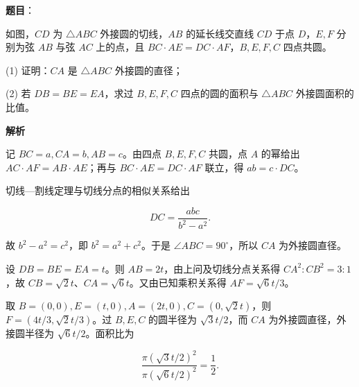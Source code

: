 \begin{answer}

\textbf{题目}：

如图，$CD$ 为 $\triangle ABC$ 外接圆的切线，$AB$ 的延长线交直线 $CD$ 于点 $D$，$E,F$ 分别为弦 $AB$ 与弦 $AC$ 上的点，且 $BC\cdot AE=DC\cdot AF$，$B,E,F,C$ 四点共圆。
\nopagebreak[4]
\begin{center}\end{center}
\nopagebreak[4]
(1) 证明：$CA$ 是 $\triangle ABC$ 外接圆的直径；

(2) 若 $DB=BE=EA$，求过 $B,E,F,C$ 四点的圆的面积与 $\triangle ABC$ 外接圆面积的比值。

\textbf{解析}


记 $BC=a,CA=b,AB=c$。由四点 $B,E,F,C$ 共圆，点 $A$ 的幂给出 $AC\cdot AF=AB\cdot AE$；再与 $BC\cdot AE=DC\cdot AF$ 联立，得 $ab=c\cdot DC$。

切线—割线定理与切线分点的相似关系给出

\nopagebreak[4]
\[DC=\frac{abc}{b^2-a^2}.\]

故 $b^2-a^2=c^2$，即 $b^2=a^2+c^2$。于是 $\angle ABC=90^\circ$，所以 $CA$ 为外接圆直径。


设 $DB=BE=EA=t$。则 $AB=2t$，由上问及切线分点关系得 $CA^2:CB^2=3:1$，故 $CB=\sqrt2t$、$CA=\sqrt6t$。又由已知乘积关系得 $AF=\sqrt6t/3$。

取 $B=(0,0),E=(t,0),A=(2t,0),C=(0,\sqrt2t)$，则 $F=(4t/3,\sqrt2t/3)$。过 $B,E,C$ 的圆半径为 $\sqrt3t/2$，而 $CA$ 为外接圆直径，外接圆半径为 $\sqrt6t/2$。面积比为

\nopagebreak[4]
\[\frac{\pi(\sqrt3t/2)^2}{\pi(\sqrt6t/2)^2}=\frac12.\]



\end{answer}
